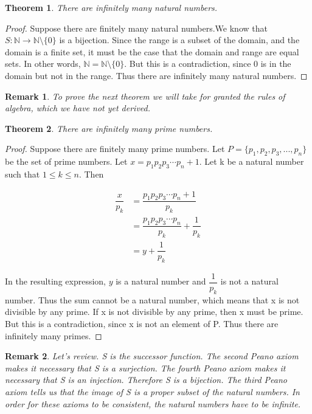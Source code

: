 \documentclass{article}
\newtheorem{theorem}{Theorem}
\newtheorem{remark}{Remark}
\begin{document}
\begin{theorem}
There are infinitely many natural numbers. 
\end{theorem}

\begin{proof}
Suppose there are finitely many natural numbers.We know that $S : \mathbb{N} \to \mathbb{N}\setminus\{0\}$ is a bijection. Since the range is a subset of the domain, and the domain is a finite set, it must be the case that the domain and range are equal sets. In other words, $\mathbb{N} = \mathbb{N}\setminus\{0\}$. But this is a contradiction, since 0 is in the domain but not in the range. Thus there are infinitely many natural numbers. 
\end{proof}

\begin{remark}
To prove the next theorem we will take for granted the rules of algebra, which we have not yet derived.
\end{remark}

\begin{theorem}
There are infinitely many prime numbers.
\end{theorem}

\begin{proof}
Suppose there are finitely many prime numbers. Let $P = \{p_{1}, p_{2}, p_{3}, ... ,p_{n}\}$ be the set of prime numbers. Let $x = p_{1}p_{2}p_{3} \dotsm p_{n} + 1$. Let k be a natural number such that $1 \leq k \leq n$. Then 

\begin{align*}
\dfrac{x}{p_{k}} &= \dfrac{p_{1}p_{2}p_{3} \dotsm p_{n} + 1}{p_{k}} \\
&= \dfrac{p_{1}p_{2}p_{3} \dotsm p_{n}}{p_{k}} + \dfrac{1}{p_{k}} \\
&= y + \dfrac{1}{p_{k}}
\end{align*}

In the resulting expression, $y$ is a natural number and $\dfrac{1}{p_{k}}$ is not a natural number. Thus the sum cannot be a natural number, which means that x is not divisible by any prime. If x is not divisible by any prime, then x must be prime. But this is a contradiction, since x is not an element of P. Thus there are infinitely many primes. 
\end{proof}

\begin{remark}
Let's review. S is the successor function. The second Peano axiom makes it necessary that S is a surjection. The fourth Peano axiom makes it necessary that S is an injection. Therefore S is a bijection. The third Peano axiom tells us that the image of S is a proper subset of the natural numbers. In order for these axioms to be consistent, the natural numbers have to be infinite.
\end{remark}
\end{document}

